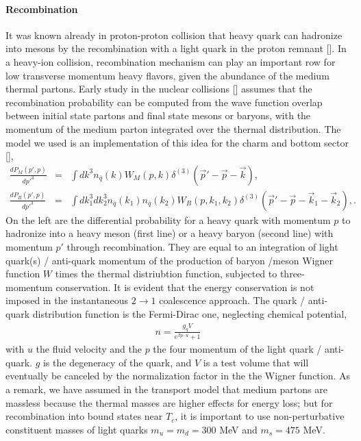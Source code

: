 \paragraph{Recombination}
It was known already in proton-proton collision that heavy quark can hadronize into mesons by the recombination with a light quark in the proton remnant [].
In a heavy-ion collision, recombination mechanism can play an important row for low transverse momentum heavy flavors, given the abundance of the medium thermal partons.
Early study in the nuclear collisions [] assumes that the recombination probability can be computed from the wave function overlap between initial state partons and final state mesons or baryons, with the momentum of the medium parton integrated over the thermal distribution.
The model we used is an implementation of this idea for the charm and bottom sector [],
\begin{eqnarray}
\frac{dP_M(p', p)}{dp'^3} &=& \int dk^3 n_{\bar{q}}(k) W_{M}(p, k)\delta^{(3)}(\vec{p}'-\vec{p}-\vec{k}), \label{eq:meson_recombine}\\
\frac{dP_B(p', p)}{dp'^3} &=& \int dk_1^3 dk_2^3 n_{\bar{q}}(k_1)  n_{\bar{q}}(k_2) W_{B}(p, k_1, k_2)\delta^{(3)}(\vec{p}'-\vec{p}-\vec{k}_1 - \vec{k}_2), \label{eq:baryon_recombine}.
\end{eqnarray}
On the left are the differential probability for a heavy quark with momentum $p$ to hadronize into a heavy meson (first line) or a heavy baryon (second line) with momentum $p'$ through recombination.
They are equal to an integration of light quark(s) / anti-quark momentum  of the production of baryon /meson Wigner function $W$ times the thermal distriubtion function, subjected to three-momentum conservation.
It is evident that the energy conservation is not imposed in the instantaneous $2\rightarrow 1$ coalescence approach.
The quark / anti-quark distribution function is the Fermi-Dirac one, neglecting chemical potential, 
\begin{eqnarray}
n = \frac{g_q V}{e^{\beta p\cdot u} + 1}
\end{eqnarray}
with $u$ the fluid velocity and the $p$ the four momentum of the light quark / anti-quark.
$g$ is the degeneracy of the quark, and $V$ is a test volume that will eventually be canceled by the normalization factor in the the Wigner function.
As a remark, we have assumed in the transport model that medium partons are massless because the thermal masses are higher effects for energy loss; but for recombination into bound states near $T_c$, it is important to use non-perturbative constituent masses of light quarks $m_u = m_d = 300$ MeV and $m_s = 475$ MeV.

